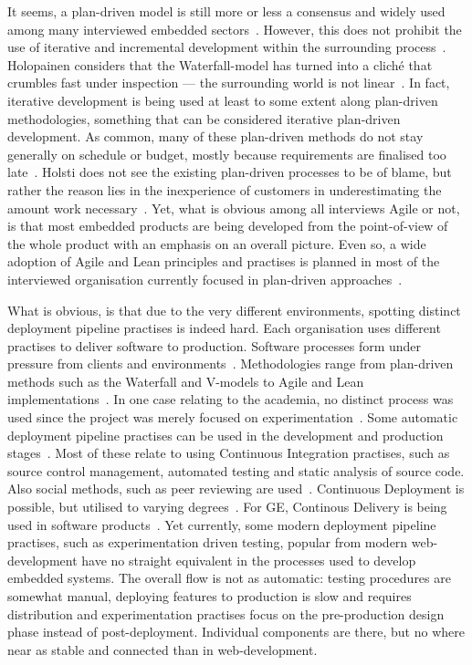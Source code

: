 \documentclass[english]{tktltiki2}
\begin{document}
It seems, a plan-driven model is still more or less a consensus and widely used among many interviewed embedded sectors~\cite{Hol15b, Koi15}. However, this does not prohibit the use of iterative and incremental development within the surrounding process~\cite{Hol15b}. Holopainen considers that the Waterfall-model has turned into a cliché that crumbles fast under inspection — the surrounding world is not linear~\cite{Hol15a}. In fact, iterative development is being used at least to some extent along plan-driven methodologies, something that can be considered iterative plan-driven development. As common, many of these plan-driven methods do not stay generally on schedule or budget, mostly because requirements are finalised too late~\cite{Hol15b}. Holsti does not see the existing plan-driven processes to be of blame, but rather the reason lies in the inexperience of customers in underestimating the amount work necessary~\cite{Hol15b}. Yet, what is obvious among all interviews Agile or not, is that most embedded products are being developed from the point-of-view of the whole product with an emphasis on an overall picture. Even so, a wide adoption of Agile and Lean principles and practises is planned in most of the interviewed organisation currently focused in plan-driven approaches~\cite{Koi15}.

What is obvious, is that due to the very different environments, spotting distinct deployment pipeline practises is indeed hard. Each organisation uses different practises to deliver software to production. Software processes form under pressure from clients and environments~\cite{Hol15a, Hol15b}. Methodologies range from plan-driven methods such as the Waterfall and V-models to Agile and Lean implementations~\cite{Hol15b, Koi15}. In one case relating to the academia, no distinct process was used since the project was merely focused on experimentation~\cite{Kri15}. Some automatic deployment pipeline practises can be used in the development and production stages~\cite{BT15, Hol15a, Hol15b, Koi15, Pet15}. Most of these relate to using Continuous Integration practises, such as source control management, automated testing and static analysis of source code. Also social methods, such as peer reviewing are used~\cite{Hol15b}. Continuous Deployment is possible, but utilised to varying degrees~\cite{BT15, Hol15a, Hol15b, Koi15}. For GE, Continous Delivery is being used in software products~\cite{BT15}. Yet currently, some modern deployment pipeline practises, such as experimentation driven testing, popular from modern web-development have no straight equivalent in the processes used to develop embedded systems. The overall flow is not as automatic: testing procedures are somewhat manual, deploying features to production is slow and requires distribution and experimentation practises focus on the pre-production design phase instead of post-deployment. Individual components are there, but no where near as stable and connected than in web-development.
\end{document}

